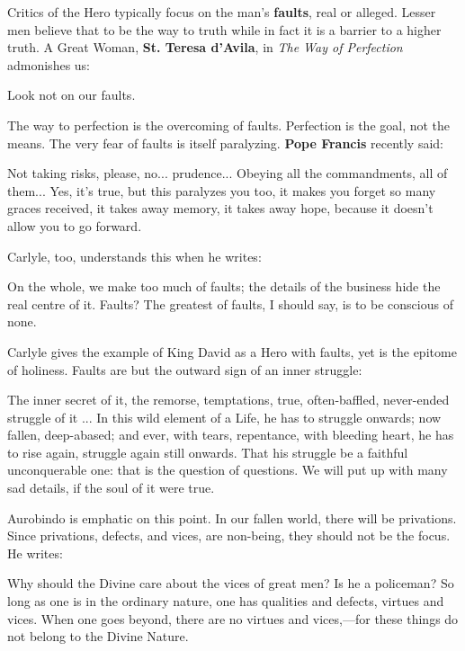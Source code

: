 Critics of the Hero typically focus on the man's \textbf{faults}, real or alleged. Lesser men believe that to be the way to truth while in fact it is a barrier to a higher truth. A Great Woman, \textbf{St. Teresa d'Avila}, in \emph{The Way of Perfection} admonishes us:

\begin{quotex}
Look not on our faults.
\end{quotex}


The way to perfection is the overcoming of faults. Perfection is the goal, not the means. The very fear of faults is itself paralyzing. \textbf{Pope Francis} recently said:


\begin{quotex}
Not taking risks, please, no... prudence... Obeying all the commandments, all of them... Yes, it's true, but this paralyzes you too, it makes you forget so many graces received, it takes away memory, it takes away hope, because it doesn't allow you to go forward.
\end{quotex}


Carlyle, too, understands this when he writes:

\begin{quotex}
On the whole, we make too much of faults; the details of the business hide the real centre of it. Faults? The greatest of faults, I should say, is to be conscious of none.
\end{quotex}


Carlyle gives the example of King David as a Hero with faults, yet is the epitome of holiness. Faults are but the outward sign of an inner struggle:

\begin{quotex}
The inner secret of it, the remorse, temptations, true, often-baffled, never-ended struggle of it ... In this wild element of a Life, he has to struggle onwards; now fallen, deep-abased; and ever, with tears, repentance, with bleeding heart, he has to rise again, struggle again still onwards. That his struggle be a faithful unconquerable one: that is the question of questions. We will put up with many sad details, if the soul of it were true.
\end{quotex}


Aurobindo is emphatic on this point. In our fallen world, there will be privations. Since privations, defects, and vices, are non-being, they should not be the focus. He writes:

\begin{quotex}
Why should the Divine care about the vices of great men? Is he a policeman? So long as one is in the ordinary nature, one has qualities and defects, virtues and vices. When one goes beyond, there are no virtues and vices,---for these things do not belong to the Divine Nature.
\end{quotex}


